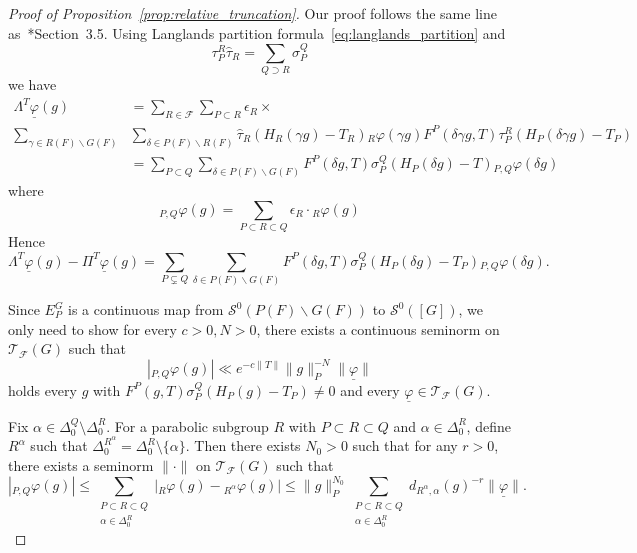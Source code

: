 \documentclass[letterpaper,11pt]{amsart}
\newcommand{\cF}{\mathcal{F}}
\newcommand{\cS}{\mathcal{S}}
\newcommand{\cT}{\mathcal{T}}
\newcommand{\<}{\negthickspace}
\theoremstyle{definition}
\theoremstyle{plain}
\theoremstyle{remark}
\numberwithin{equation}{section}
\begin{document}
\begin{proof}[Proof of Proposition~\ref{prop:relative_truncation}]
Our proof follows the same line as~\cite{BPCZ}*{Section~3.5}. Using Langlands
partition formula~\eqref{eq:langlands_partition} and
    \[
    \tau_P^R \widehat{\tau}_R = \sum_{Q \supset R} \sigma_P^Q
    \]
we have
    \begin{align*}
    \Lambda^T \underline{\varphi}(g)
    &= \sum_{R \in \cF} \sum_{P \subset R} \epsilon_R \times \\
    \sum_{\gamma \in R(F) \backslash G(F)}
    &  \sum_{\delta \in P(F) \backslash R(F)}
    \widehat{\tau}_{R}(H_R(\gamma g)-T_R) {}_R \varphi(\gamma g)
    F^P(\delta \gamma g,T) \tau_P^R(H_P(\delta \gamma g)-T_P)  \\
    &=\sum_{P \subset Q} \sum_{\delta \in P(F) \backslash G(F)}
    F^P(\delta g,T) \sigma_P^Q(H_P(\delta g)-T) {}_{P,Q} \varphi(\delta g)
    \end{align*}
where
    \[
    {}_{P,Q} \varphi(g) = \sum_{P \subset R \subset Q}
    \epsilon_R \cdot {}_R \varphi(g)
    \]
Hence
    \[
    \Lambda^T \underline{\varphi}(g) - \Pi^T \underline{\varphi}(g) =
    \sum_{P \subsetneq Q} \sum_{\delta \in P(F) \backslash G(F)}
    F^P(\delta g,T) \sigma_P^Q(H_P(\delta g)-T_P) {}_{P,Q}\varphi(\delta g).
    \]

Since $E_P^G$ is a continuous map from $\cS^0(P(F)\backslash G(F))$ to $\cS^0([G])$, we only
need to show for every $c>0,N>0$, there exists a continuous seminorm on
$\cT_{\cF}(G)$ such that
    \begin{equation} \label{eq:relative_truncation_only_need}
    \left| {}_{P,Q} \varphi(g) \right| \ll e^{-c\|T\|} \|g\|_P^{-N} \|
    \underline{\varphi} \|
    \end{equation}
holds every $g$ with $F^P(g,T)\sigma_P^Q(H_P(g)-T_P)\ne 0$ and every
$\underline{\varphi} \in \cT_{\cF}(G)$.

Fix $\alpha \in \Delta_0^Q \setminus \Delta_0^R$. For a parabolic subgroup $R$ with $P
\subset R \subset Q$ and $\alpha \in \Delta_0^R$, define $R^\alpha$ such that
$\Delta_0^{R^\alpha}=\Delta_0^R \setminus \{ \alpha \}$. Then there exists
$N_0>0$ such that for any $r>0$, there exists a seminorm $\| \cdot \|$ on
$\cT_{\cF}(G)$ such that
    \[
    \left|  {}_{P,Q}\varphi(g) \right|
    \le \sum_{ \substack{ P \subset R \subset Q \\ \alpha \in \Delta_0^R }}
    \left| {}_R \varphi(g)-{}_{R^\alpha} \varphi(g) \right|
    \le \|g\|_P^{N_0}
    \sum_{ \substack{P \subset R \subset Q \\ \alpha \in \Delta_0^R}}
    d_{R^\alpha,\alpha}(g)^{-r} \| \underline{\varphi} \|.
    \]


\end{proof}
\end{document}
